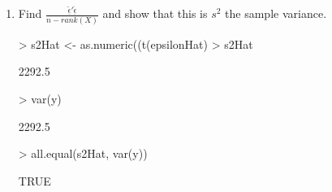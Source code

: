 \documentclass[12pt,a4paper]{paper}
\begin{document}
\begin{enumerate}
\begin{enumerate}
\item Find $\frac{\hat{\underline{\epsilon}}'\hat{\underline{\epsilon}}}{n - rank(X)}$ and show that this is $s^{2}$ the sample variance.
\begin{Schunk}
\begin{Sinput}
> s2Hat <- as.numeric((t(epsilonHat) %*% epsilonHat) / (length(y) - 1))
> s2Hat
\end{Sinput}
\begin{Soutput}
[1] 2292.5
\end{Soutput}
\begin{Sinput}
> var(y)
\end{Sinput}
\begin{Soutput}
[1] 2292.5
\end{Soutput}
\begin{Sinput}
> all.equal(s2Hat, var(y))
\end{Sinput}
\begin{Soutput}
[1] TRUE
\end{Soutput}
\end{Schunk}
\end{enumerate}
\end{enumerate}
\end{document}
